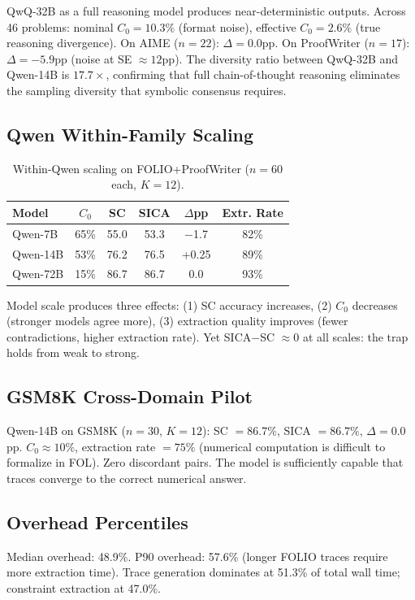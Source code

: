 \documentclass[11pt,a4paper]{article}
\begin{document}
QwQ-32B as a full reasoning model produces near-deterministic outputs. Across 46 problems: nominal $C_0 = 10.3\%$ (format noise), effective $C_0 = 2.6\%$ (true reasoning divergence). On AIME ($n{=}22$): $\Delta = 0.0$pp. On ProofWriter ($n{=}17$): $\Delta = -5.9$pp (noise at SE $\approx 12$pp). The diversity ratio between QwQ-32B and Qwen-14B is $17.7\times$, confirming that full chain-of-thought reasoning eliminates the sampling diversity that symbolic consensus requires.

\subsection{Qwen Within-Family Scaling}

\begin{table}[h]
\centering
\small
\caption{Within-Qwen scaling on FOLIO+ProofWriter ($n{=}60$ each, $K{=}12$).}
\label{tab:qwen-scaling}
\begin{tabular}{lccccc}
\toprule
\textbf{Model} & $C_0$ & SC & SICA & $\Delta$pp & Extr. Rate \\
\midrule
Qwen-7B & 65\% & 55.0 & 53.3 & $-$1.7 & 82\% \\
Qwen-14B & 53\% & 76.2 & 76.5 & +0.25 & 89\% \\
Qwen-72B & 15\% & 86.7 & 86.7 & 0.0 & 93\% \\
\bottomrule
\end{tabular}
\end{table}

Model scale produces three effects: (1) SC accuracy increases, (2) $C_0$ decreases (stronger models agree more), (3) extraction quality improves (fewer contradictions, higher extraction rate). Yet SICA$-$SC $\approx 0$ at all scales: the trap holds from weak to strong.

\subsection{GSM8K Cross-Domain Pilot}

Qwen-14B on GSM8K ($n{=}30$, $K{=}12$): SC $= 86.7\%$, SICA $= 86.7\%$, $\Delta = 0.0$pp. $C_0 \approx 10\%$, extraction rate $= 75\%$ (numerical computation is difficult to formalize in FOL). Zero discordant pairs. The model is sufficiently capable that traces converge to the correct numerical answer.

\subsection{Overhead Percentiles}

Median overhead: 48.9\%. P90 overhead: 57.6\% (longer FOLIO traces require more extraction time). Trace generation dominates at 51.3\% of total wall time; constraint extraction at 47.0\%.
\end{document}
